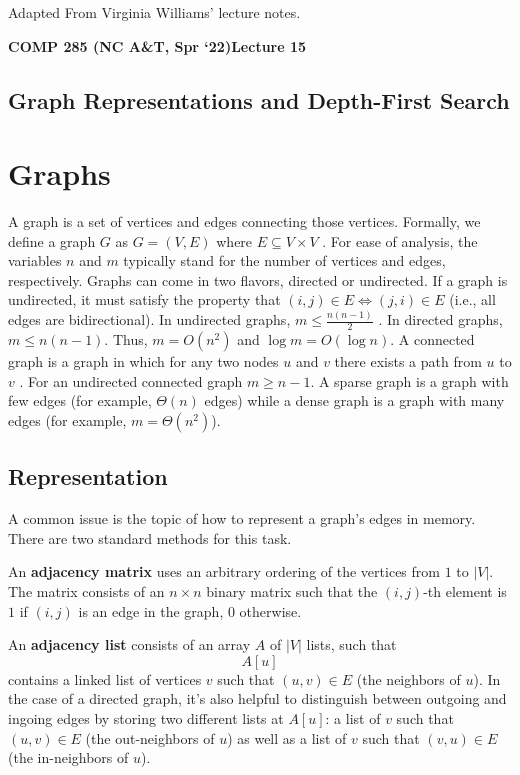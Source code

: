 \documentclass [12pt]{article}
\begin{document}
 

\vspace {1em} 
\begin {Instruction} 
Adapted From Virginia Williams' lecture notes.
\end {Instruction}  

{\LARGE \textbf {COMP 285 (NC A\&T, Spr `22)}\hfill \textbf {Lecture 15} } 

\begin{centering}
\section*{Graph Representations and Depth-First Search}
\end{centering}

\section{Graphs}
A graph is a set of vertices and edges connecting those vertices. Formally, we define a graph $G$ as $G = (V, E)$ where $E \subseteq V \times V$ . For ease of analysis, the variables $n$ and $m$ typically stand for the number of vertices and edges, respectively. Graphs can come in two flavors, directed or undirected. If a graph is undirected, it must satisfy the property that $(i, j) \in E \iff (j, i) \in E$ (i.e., all edges are bidirectional). In undirected graphs, $m \leq \frac{n(n-1)}{2}$ . In directed graphs, $m \leq n(n - 1)$. Thus, $m = O(n^2)$ and $\log m = O(\log n)$. A connected graph is a graph in which for any two nodes $u$ and $v$ there exists a path from $u$ to $v$ . For an undirected connected graph $m \geq n - 1$. A sparse graph is a graph with few edges (for example, $\Theta(n)$ edges) while a dense graph is a graph with many edges (for example, $m = \Theta(n^2)$).

\subsection{Representation} 

A common issue is the topic of how to represent a graph's edges in memory. There are two standard methods for this task. 

An \textbf{adjacency matrix} uses an arbitrary ordering of the vertices from $1$ to $|V|$. The matrix consists of an $n \times n$ binary matrix such that the $(i, j)$-th element is $1$ if $(i, j)$ is an edge in the graph, $0$ otherwise. 

An \textbf{adjacency list} consists of an array $A$ of $|V |$ lists, such that $$A[u]$$ contains a linked list of vertices $v$ such that $(u, v) \in E$ (the neighbors of $u$). In the case of a directed graph, it's also helpful to distinguish between outgoing and ingoing edges by storing two different lists at $A[u]$: a list of $v$ such that $(u, v ) \in E$ (the out-neighbors of $u$) as well as a list of $v$ such that $(v, u) \in E$ (the in-neighbors of $u$). 
\end{document}
